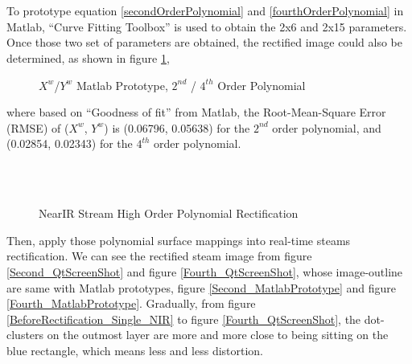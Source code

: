 \\\\%
To prototype equation \ref{secondOrderPolynomial} and \ref{fourthOrderPolynomial} in Matlab, \enquote{Curve Fitting Toolbox} is used to obtain the 2x6 and 2x15 parameters. Once those two set of parameters are obtained, the rectified image could also be determined, as shown in figure \ref{MatlabPrototpyeOfHighOrder},\par%
%
\begin{figure}[h]
\hspace*{-0.3cm}
\centering
{}
{}
%
\caption{\(X^w\)/\(Y^w\) Matlab Prototype, \(2^{nd}\) / \(4^{th}\) Order Polynomial}
\label{MatlabPrototpyeOfHighOrder}
\end{figure}%
%
where based on \enquote{Goodness of fit} from Matlab, the Root-Mean-Square Error (RMSE) of (\(X^w\), \(Y^w\)) is (0.06796, 0.05638) for the \(2^{nd}\) order polynomial, and (0.02854, 0.02343) for the \(4^{th}\) order polynomial.
\\\\%
%
 \begin{figure}[h]
\centering
{}
\\%
\hspace*{-0.3cm}
%
%
\caption{NearIR Stream High Order Polynomial Rectification}
\label{HighOrderNearIRRectification}
\end{figure}%
%
Then, apply those polynomial surface mappings into real-time steams rectification. We can see the rectified steam image from figure \ref{Second_QtScreenShot} and figure \ref{Fourth_QtScreenShot}, whose image-outline are same with Matlab prototypes, figure \ref{Second_MatlabPrototype} and figure \ref{Fourth_MatlabPrototype}. Gradually, from figure \ref{BeforeRectification_Single_NIR} to figure \ref{Fourth_QtScreenShot}, the dot-clusters on the outmost layer are more and more close to being sitting on the blue rectangle, which means less and less distortion.%
